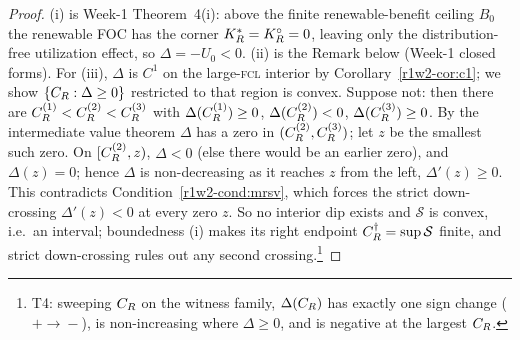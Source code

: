 \begin{proof}
(i) is Week-1 Theorem~4(i): above the finite renewable-benefit ceiling $B_0$ the
renewable FOC has the corner $K_R^{*}=K_R^{\circ}=0$, leaving only the distribution-free
utilization effect, so $\Delta=-U_0<0$. (ii) is the Remark below (Week-1 closed
forms). For (iii), $\Delta$ is $C^{1}$ on the large-\textsc{fcl} interior by
Corollary~\ref{r1w2-cor:c1}; we show $\{C_R:\Delta\ge0\}$ restricted to that region is
convex. Suppose not: then there are
$C_R^{(1)}<C_R^{(2)}<C_R^{(3)}$ with $\Delta(C_R^{(1)})\ge0$, $\Delta(C_R^{(2)})<0$,
$\Delta(C_R^{(3)})\ge0$. By the intermediate value theorem $\Delta$ has a zero in
$(C_R^{(2)},C_R^{(3)})$; let $z$ be the smallest such zero. On $[C_R^{(2)},z)$, $\Delta<0$
(else there would be an earlier zero), and $\Delta(z)=0$; hence $\Delta$ is
non-decreasing as it reaches $z$ from the left, $\Delta'(z)\ge0$. This contradicts
Condition~\ref{r1w2-cond:mrsv}, which forces the strict down-crossing $\Delta'(z)<0$ at
every zero $z$. So no interior dip exists and $\mathcal S$ is convex, i.e.\ an
interval; boundedness (i) makes its right endpoint $C_R^{\dagger}=\sup\mathcal S$
finite, and strict down-crossing rules out any second crossing.\footnote{T4:
sweeping $C_R$ on the witness family, $\Delta(C_R)$ has exactly one sign change
($+\!\to\!-$), is non-increasing where $\Delta\ge0$, and is negative at the
largest $C_R$.}
\end{proof}

